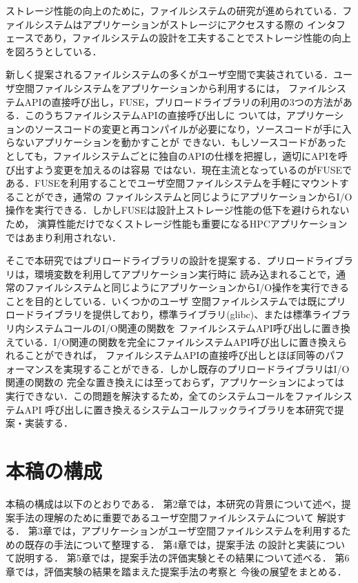 \documentclass[a4paper，11pt]{jreport}
\begin{document}
ストレージ性能の向上のために，ファイルシステムの研究が進められている．ファイルシステムはアプリケーションがストレージにアクセスする際の
インタフェースであり，ファイルシステムの設計を工夫することでストレージ性能の向上を図ろうとしている． 

新しく提案されるファイルシステムの多くがユーザ空間で実装されている．ユーザ空間ファイルシステムをアプリケーションから利用するには，
ファイルシステムAPIの直接呼び出し，FUSE，プリロードライブラリの利用の3つの方法がある．このうちファイルシステムAPIの直接呼び出しに
ついては，アプリケーションのソースコードの変更と再コンパイルが必要になり，ソースコードが手に入らないアプリケーションを動かすことが
できない．もしソースコードがあったとしても，ファイルシステムごとに独自のAPIの仕様を把握し，適切にAPIを呼び出すよう変更を加えるのは容易
ではない．現在主流となっているのがFUSEである．FUSEを利用することでユーザ空間ファイルシステムを手軽にマウントすることができ，通常の
ファイルシステムと同じようにアプリケーションからI/O操作を実行できる．しかしFUSEは設計上ストレージ性能の低下を避けられないため，
演算性能だけでなくストレージ性能も重要になるHPCアプリケーションではあまり利用されない．

そこで本研究ではプリロードライブラリの設計を提案する．プリロードライブラリは，環境変数を利用してアプリケーション実行時に
読み込まれることで，通常のファイルシステムと同じようにアプリケーションからI/O操作を実行できることを目的としている．いくつかのユーザ
空間ファイルシステムでは既にプリロードライブラリを提供しており，標準ライブラリ(glibc)、または標準ライブラリ内システムコールのI/O関連の関数を
ファイルシステムAPI呼び出しに置き換えている．I/O関連の関数を完全にファイルシステムAPI呼び出しに置き換えられることができれば，
ファイルシステムAPIの直接呼び出しとほぼ同等のパフォーマンスを実現することができる．しかし既存のプリロードライブラリはI/O関連の関数の
完全な置き換えには至っておらず，アプリケーションによっては実行できない．この問題を解決するため，全てのシステムコールをファイルシステムAPI
呼び出しに置き換えるシステムコールフックライブラリを本研究で提案・実装する．
\section{本稿の構成}
本稿の構成は以下のとおりである． 第2章では，本研究の背景について述べ，提案手法の理解のために重要であるユーザ空間ファイルシステムについて
解説する． 第3章では，アプリケーションがユーザ空間ファイルシステムを利用するための既存の手法について整理する． 第4章では，提案手法
の設計と実装について説明する． 第5章では，提案手法の評価実験とその結果について述べる． 第6章では，評価実験の結果を踏まえた提案手法の考察と
今後の展望をまとめる．
\end{document}
